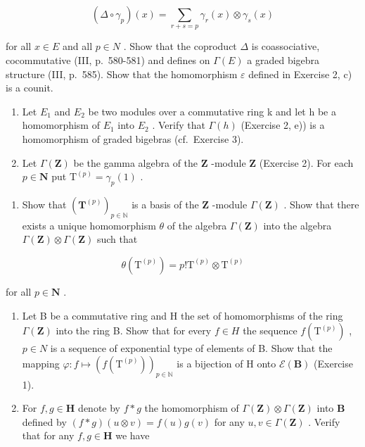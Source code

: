 \[
(\Delta \circ \gamma_ {p}) (x) = \sum_ {r + s = p} \gamma_ {r} (x) \otimes \gamma_ {s} (x)
\]

for all \(x \in E\) and all \(p \in N\) . Show that the coproduct \(\Delta\) is coassociative, cocommutative (III, p.~580-581) and defines on \(\Gamma(E)\) a graded bigebra structure (III, p.~585). Show that the homomorphism \(\varepsilon\) defined in Exercise 2, c) is a counit.

\begin{enumerate}
\def\labelenumi{\arabic{enumi})}
\setcounter{enumi}{3}
\item
  Let \(E_{1}\) and \(E_{2}\) be two modules over a commutative ring k and let h be a homomorphism of \(E_{1}\) into \(E_{2}\) . Verify that \(\Gamma(h)\) (Exercise 2, e)) is a homomorphism of graded bigebras (cf.~Exercise 3).
\item
  Let \(\Gamma(\mathbf{Z})\) be the gamma algebra of the \(\mathbf{Z}\) -module \(\mathbf{Z}\) (Exercise 2). For each \(p \in \mathbf{N}\) put \(\mathrm{T}^{(p)} = \gamma_p(1)\) .
\end{enumerate}

\begin{enumerate}
\def\labelenumi{\alph{enumi})}
\tightlist
\item
  Show that \((\mathbf{T}^{(p)})_{p\in \mathbb{N}}\) is a basis of the \(\mathbf{Z}\) -module \(\Gamma (\mathbf{Z})\) . Show that there exists a unique homomorphism \(\theta\) of the algebra \(\Gamma (\mathbf{Z})\) into the algebra \(\Gamma (\mathbf{Z})\otimes \Gamma (\mathbf{Z})\) such that
\end{enumerate}

\[
\theta \left(\mathrm{T} ^ {(p)}\right) = p! \mathrm{T} ^ {(p)} \otimes \mathrm{T} ^ {(p)}
\]

for all \(p \in \mathbf{N}\) .

\begin{enumerate}
\def\labelenumi{\alph{enumi})}
\setcounter{enumi}{1}
\item
  Let B be a commutative ring and H the set of homomorphisms of the ring \(\Gamma(\mathbf{Z})\) into the ring B. Show that for every \(f \in H\) the sequence \(f(\mathrm{T}^{(p)})\) , \(p \in N\) is a sequence of exponential type of elements of B. Show that the mapping \(\varphi: f \mapsto (f(\mathrm{T}^{(p)}))_{p \in \mathbb{N}}\) is a bijection of H onto \(\mathcal{E}(\mathbf{B})\) (Exercise 1).
\item
  For \(f, g \in \mathbf{H}\) denote by \(f * g\) the homomorphism of \(\Gamma(\mathbf{Z}) \otimes \Gamma(\mathbf{Z})\) into \(\mathbf{B}\) defined by \((f * g)(u \otimes v) = f(u)g(v)\) for any \(u, v \in \Gamma(\mathbf{Z})\) . Verify that for any \(f, g \in \mathbf{H}\) we have
\end{enumerate}

